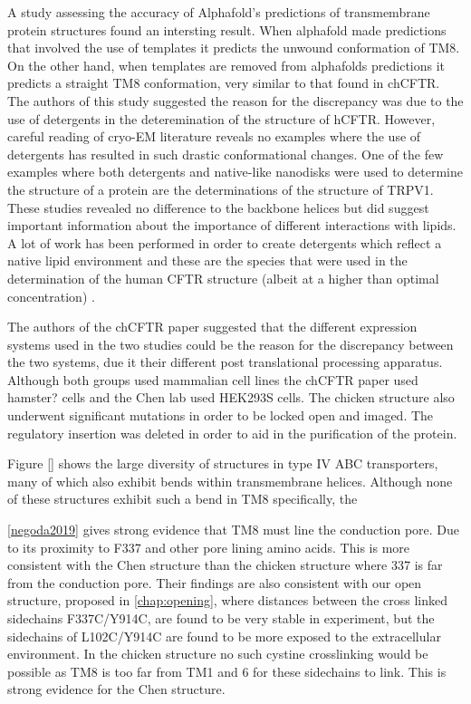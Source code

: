 A study assessing the accuracy of Alphafold's predictions of transmembrane protein structures found an intersting result. When alphafold made predictions that involved the use of templates it predicts the unwound conformation of TM8. On the other hand, when templates are removed from alphafolds predictions it predicts a straight TM8 conformation, very similar to that found in chCFTR. The authors of this study suggested the reason for the discrepancy was due to the use of detergents in the deteremination of the structure of hCFTR. However, careful reading of cryo-EM literature reveals no examples where the use of detergents has resulted in such drastic conformational changes. One of the few examples where both detergents and native-like nanodisks were used to determine the structure of a protein are the determinations of the structure of TRPV1. These studies revealed no difference to the backbone helices but did suggest important information about the importance of different interactions with lipids\cite{gao2016}. A lot of work has been performed in order to create detergents which reflect a native lipid environment and these are the species that were used in the determination of the human CFTR structure (albeit at a higher than optimal concentration) \cite{gao2016, zhang2018, kampjut2021}. 

The authors of the chCFTR paper suggested that the different expression systems used in the two studies could be the reason for the discrepancy between the two systems, due it their different post translational processing apparatus. Although both groups used mammalian cell lines the chCFTR paper used hamster? cells \cite{aleksandrov2015} and the Chen lab used HEK293S cells. The chicken structure also underwent significant mutations in order to be locked open and imaged. The regulatory insertion was deleted in order to aid in the purification of the protein. 

Figure \ref{} shows the large diversity of structures in type IV ABC transporters, many of which also exhibit bends within transmembrane helices\cite{thomas2020}. Although none of these structures exhibit such a bend in TM8 specifically, the 

\ref{negoda2019} gives strong evidence that TM8 must line the conduction pore. Due to its proximity to F337 and other pore lining amino acids. This is more consistent with the Chen structure than the chicken structure where 337 is far from the conduction pore. Their findings are also consistent with our open structure, proposed in \ref{chap:opening}, where distances between the cross linked sidechains F337C/Y914C, are found to be very stable in experiment, but the sidechains of L102C/Y914C are found to be more exposed to the extracellular environment. In the chicken structure no such cystine crosslinking would be possible as TM8 is too far from TM1 and 6 for these sidechains to link. This is strong evidence for the Chen structure.

